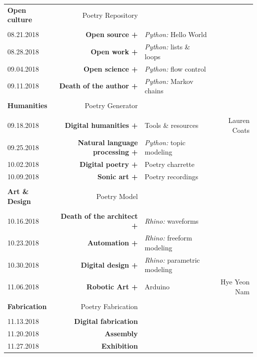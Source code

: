 \documentclass[11pt,article,oneside]{memoir}
\begin{document}
\begin{table}[H]
\begin{tabular}{l r @{\hskip 0.1cm} l r}
\\
\normalsize
\textbf{Open culture} & Poetry Repository\\
\small
\\
08.21.2018 & \textbf{Open source +} & \emph{Python:} Hello World \\
08.28.2018 & \textbf{Open work +} & \emph{Python:} lists \& loops \\
09.04.2018 & \textbf{Open science +} & \emph{Python:} flow control \\ %
09.11.2018 & \textbf{Death of the author +} & \emph{Python:} Markov chains \\ %
\\
\normalsize

\textbf{Humanities} & Poetry Generator\\
\small
\\
09.18.2018 & \textbf{Digital humanities +} & Tools \& resources  & Lauren Coats \\
09.25.2018 & \textbf{Natural language processing +} & \emph{Python:} topic modeling \\
10.02.2018 & \textbf{Digital poetry +} & Poetry charrette \\ %
10.09.2018 & \textbf{Sonic art +} & Poetry recordings \\ %
\\
\normalsize
\textbf{Art \& Design} & Poetry Model \\
\small
\\
10.16.2018 & \textbf{Death of the architect +} & \emph{Rhino:} waveforms \\
10.23.2018 & \textbf{Automation +} & \emph{Rhino:} freeform modeling \\
10.30.2018 & \textbf{Digital design +} & \emph{Rhino:} parametric modeling \\
11.06.2018 & \textbf{Robotic Art +} & Arduino & Hye Yeon Nam \\
\\
\normalsize
\textbf{Fabrication} & Poetry Fabrication\\
\small
\\
11.13.2018 & \textbf{Digital fabrication} \\
11.20.2018 & \textbf{Assembly} \\
11.27.2018 & \textbf{Exhibition} \\ 
%
\end{tabular}
\end{table}
\end{document}
